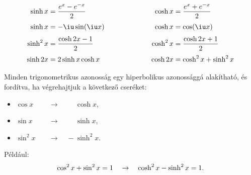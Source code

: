 \begin{blueBox}
  \begin{alignat*}{9}
    \sinh x   & = \frac{e^x - e^{-x}}{2}
    \hspace{2cm}
              & \cosh x                  & = \frac{e^x + e^{-x}}{2}
    \\[1mm]
    \sinh x   & = - \iu \sin(\iu x)
    \hspace{2cm}
              & \cosh x                  & = \cos(\iu x)
    \\[1mm]
    \sinh^2 x & = \frac{\cosh 2x - 1}{2}
    \hspace{2cm}
              & \cosh^2 x                & = \frac{\cosh 2x + 1}{2}
    \\[1mm]
    \sinh 2x  & = 2 \sinh x \cosh x
    \hspace{2cm}
              & \cosh 2x                 & = \cosh^2 x + \sinh^2 x
  \end{alignat*}
\end{blueBox}

\begin{note}

  Minden trigonometrikus azonosság egy hiperbolikus azonossággá alakítható, és
  fordítva, ha végrehajtjuk a következő cseréket:
  \begin{itemize}
    \item $\cos x \phantom{\sin^2} \to \quad \phantom{-} \cosh x$,
    \item $\sin x \phantom{\cos^2} \to \quad \phantom{-} \sinh x$,
    \item $\sin^2 x \phantom{\cos} \to \quad -\sinh^2 x $.
  \end{itemize}

  Például:
  \[
    \cos^2 x + \sin^2 x = 1 \quad \to \quad \cosh^2 x - \sinh^2 x = 1
    \text.
  \]
\end{note}

